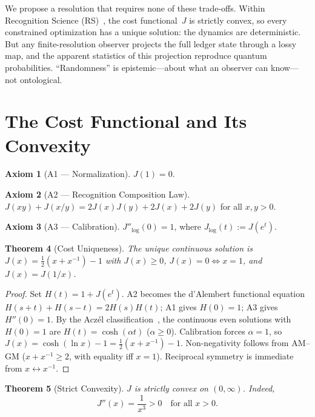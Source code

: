 \documentclass[12pt,a4paper]{article}
\newtheorem{theorem}{Theorem}[section]
\theoremstyle{definition}
\newtheorem{axiom_rs}[theorem]{Axiom}
\theoremstyle{remark}
\begin{document}
We propose a resolution that requires none of these trade-offs.  Within
Recognition Science (RS)~\cite{RS_Axioms}, the cost functional~$J$ is
strictly convex, so every constrained optimization has a unique solution:
the dynamics are deterministic.  But any finite-resolution observer
projects the full ledger state through a lossy map, and the apparent
statistics of this projection reproduce quantum probabilities.
``Randomness'' is epistemic---about what an observer can know---not
ontological.

\section{The Cost Functional and Its Convexity}
\label{sec:cost}

\begin{axiom_rs}[A1 --- Normalization]
$J(1) = 0$.
\end{axiom_rs}

\begin{axiom_rs}[A2 --- Recognition Composition Law]
$J(xy) + J(x/y) = 2J(x)J(y) + 2J(x) + 2J(y)$ for all $x, y > 0$.
\end{axiom_rs}

\begin{axiom_rs}[A3 --- Calibration]
$J''_{\log}(0) = 1$, where $J_{\log}(t) := J(e^t)$.
\end{axiom_rs}

\begin{theorem}[Cost Uniqueness]
\label{thm:J}
The unique continuous solution is $J(x) = \tfrac{1}{2}(x + x^{-1}) - 1$
with $J(x) \geq 0$, $J(x) = 0 \iff x = 1$, and $J(x) = J(1/x)$.
\end{theorem}

\begin{proof}
Set $H(t) = 1 + J(e^t)$.  A2 becomes the d'Alembert functional equation
$H(s+t) + H(s-t) = 2H(s)H(t)$; A1 gives $H(0) = 1$; A3 gives $H''(0) = 1$.
By the Acz\'el classification~\cite{Aczel1966}, the continuous even solutions
with $H(0) = 1$ are $H(t) = \cosh(\alpha t)$ ($\alpha \geq 0$).  Calibration
forces $\alpha = 1$, so $J(x) = \cosh(\ln x) - 1 = \tfrac{1}{2}(x + x^{-1}) - 1$.
Non-negativity follows from AM--GM ($x + x^{-1} \geq 2$, with equality iff
$x = 1$).  Reciprocal symmetry is immediate from $x \leftrightarrow x^{-1}$.
\end{proof}

\begin{theorem}[Strict Convexity]
\label{thm:convex}
$J$ is strictly convex on $(0, \infty)$.  Indeed,
\[
  J''(x) = \frac{1}{x^3} > 0 \quad \text{for all } x > 0.
\]
\end{theorem}
\end{document}
